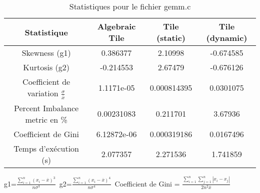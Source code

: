 \documentclass{article}
\begin{document}
\begin{table}[htbp]
  \centering
  \caption{Statistiques pour le fichier gemm.c}
  \begin{tabular}{|c|c|c|c|}
    \hline
    Statistique & Algebraic Tile & Tile (static) & Tile (dynamic) \\ 
    \hline
    Skewness (g1)  & 0.386377 & 2.10998 & -0.674585 \\ 
    Kurtosis (g2)  & -0.214553 & 2.67479 & -0.676126 \\ 
    Coefficient de variation $ \frac{\sigma}{\overline{x}} $ & 1.1171e-05 & 0.000814395 & 0.0301075\\ 
    Percent Imbalance metric en \% & 0.00231083 & 0.211701 & 3.67936\\ 
    Coefficient de Gini  & 6.12872e-06 & 0.000319186 & 0.0167496\\ 
    Temps d'exécution (s) &  2.077357    &  2.271536   &  1.741859   \\ 

    \hline
  \end{tabular}
\end{table}\newline
g1=$ \frac{\sum_{i=1}^{n} (x_i - \overline{x})^3}{n\sigma^3} $\
g2=$ \frac{\sum_{i=1}^{n} (x_i - \overline{x})^4}{n\sigma^4} $\
Coefficient de Gini = $ \frac{\sum_{i=1}^{n}\sum_{j=1}^{n} |x_i - x_j|}{2n^2\overline{x}} $\
\newpage
\end{document}
